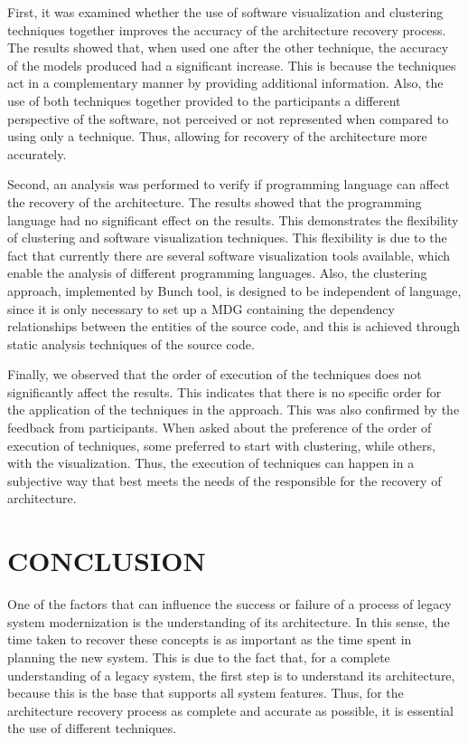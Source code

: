 \documentclass{sig-alternate-05-2015}
\begin{document}
First, it was examined whether the use of software visualization and clustering techniques together improves the accuracy of the architecture recovery process. The results showed that, when used one after the other technique, the accuracy of the models produced had a significant increase. This is because the techniques act in a complementary manner by providing additional information. Also, the use of both techniques together provided to the participants a different perspective of the software, not perceived or not represented when compared to using only a technique. Thus, allowing for recovery of the architecture more accurately. 

Second, an analysis was performed to verify if programming language can affect the recovery of the architecture. The results showed that the programming language had no significant effect on the results. This demonstrates the flexibility of clustering  and software visualization techniques. This flexibility is due to the fact that currently there are several software visualization tools available, which enable the analysis of different programming languages. Also, the clustering approach, implemented by Bunch tool, is designed to be independent of language, since it is only necessary to set up a MDG containing the dependency relationships between the entities of the source code, and this is achieved through static analysis techniques of the source code.

Finally, we observed that the order of execution of the techniques does not significantly affect the results. This indicates that there is no specific order for the application of the techniques in the approach. This was also confirmed by the feedback from participants. When asked about the preference of the order of execution of techniques, some preferred to start with clustering, while others, with the visualization. Thus, the execution of techniques can happen in a subjective way that best meets the needs of the responsible for the recovery of architecture.


\section{CONCLUSION}\label{sec:conclusion}
One of the factors that can influence the success or failure of a process of legacy system modernization is the understanding of its architecture. In this sense, the time taken to recover these concepts is as important as the time spent in planning the new system. This is due to the fact that, for a complete understanding of a legacy system, the first step is to understand its architecture, because this is the base that supports all system features. Thus, for the architecture recovery process as complete and accurate as possible, it is essential the use of different techniques.
\end{document}
